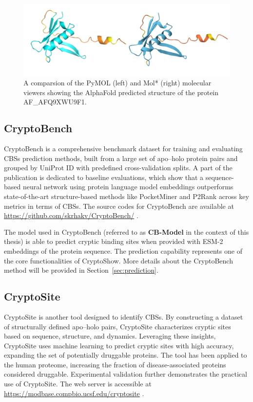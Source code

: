 \begin{figure}[ht]
    \centering
    \includegraphics[width=\textwidth]{img/pymol-molstar.png}
    \caption{A comparsion of the PyMOL (left) and Mol* (right) molecular viewers showing the AlphaFold predicted structure of the protein AF\_AFQ9XWU9F1.}
    \label{fig:pymol-molstar}
\end{figure}

\subsection{CryptoBench}
\label{sec:cryptobench}

CryptoBench is a comprehensive benchmark dataset for training and evaluating CBSs prediction methods, built from a large set of apo–holo protein pairs and grouped by UniProt ID with predefined cross-validation splits. A part of the publication is dedicated to baseline evaluations, which show that a sequence-based neural network using protein language model embeddings outperforms state-of-the-art structure-based methods like PocketMiner \cite{meller2023predicting} and P2Rank \cite{krivak2018p2rank} across key metrics in terms of CBSs. The source codes for CryptoBench are available at \url{https://github.com/skrhakv/CryptoBench/} \cite{vskrhak2025cryptobench}.

The model used in CryptoBench (referred to as \textbf{CB-Model} in the context of this thesis) is able to predict cryptic binding sites when provided with ESM-2 embeddings \cite{lin2022language} of the protein sequence. The prediction capability represents one of the core functionalities of CryptoShow. More details about the CryptoBench method will be provided in Section~\ref{sec:prediction}.

\subsection{CryptoSite}
\label{sec:cryptosite}

CryptoSite is another tool designed to identify CBSs. By constructing a dataset of structurally defined apo–holo pairs, CryptoSite characterizes cryptic sites based on sequence, structure, and dynamics. Leveraging these insights, CryptoSite uses machine learning to predict cryptic sites with high accuracy, expanding the set of potentially druggable proteins. The tool has been applied to the human proteome, increasing the fraction of disease-associated proteins considered druggable. Experimental validation further demonstrates the practical use of CryptoSite. The web server is accessible at \url{https://modbase.compbio.ucsf.edu/cryptosite} \cite{cimermancic2016cryptosite}.

